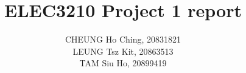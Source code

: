 \documentclass[10pt]{article}
\begin{document}
\author{CHEUNG Ho Ching, 20831821 \\ LEUNG Tsz Kit, 20863513\\ TAM Siu Ho, 20899419  } %
\title{ELEC3210 Project 1 report}
\maketitle



\end{document}
